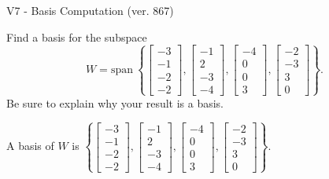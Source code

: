 \begin{exercise}
  \begin{exerciseTitle}V7 - Basis Computation (ver. 867)\end{exerciseTitle}
  \begin{exerciseStatement}
    Find a basis for the subspace 
\[W=\mathrm{span}\ \left\{\left[\begin{array}{r}
-3 \\
-1 \\
-2 \\
-2
\end{array}\right] , \left[\begin{array}{r}
-1 \\
2 \\
-3 \\
-4
\end{array}\right] , \left[\begin{array}{r}
-4 \\
0 \\
0 \\
3
\end{array}\right] , \left[\begin{array}{r}
-2 \\
-3 \\
3 \\
0
\end{array}\right]\right\}.\]
 Be sure to explain why your result is a basis.


  \end{exerciseStatement}
  \begin{exerciseAnswer}
   A basis of \(W\) is  \(\left\{\left[\begin{array}{r}
-3 \\
-1 \\
-2 \\
-2
\end{array}\right] , \left[\begin{array}{r}
-1 \\
2 \\
-3 \\
-4
\end{array}\right] , \left[\begin{array}{r}
-4 \\
0 \\
0 \\
3
\end{array}\right] , \left[\begin{array}{r}
-2 \\
-3 \\
3 \\
0
\end{array}\right]\right\}\).
  


  \end{exerciseAnswer}
\end{exercise}
